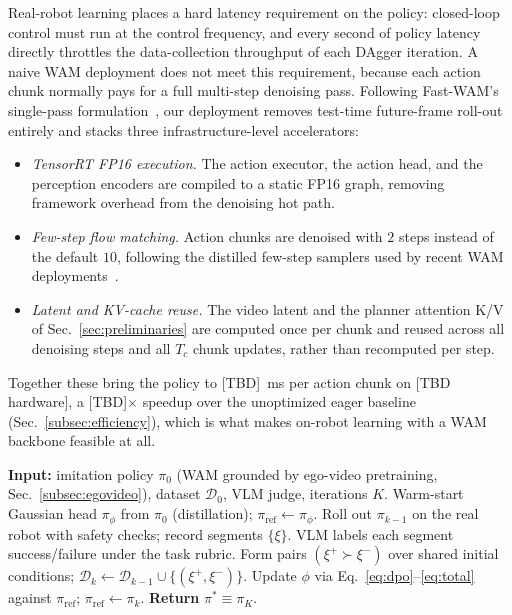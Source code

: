 \documentclass[letterpaper, 10pt, conference]{ieeeconf}
\begin{document}
Real-robot learning places a hard latency requirement on the policy: closed-loop control must run at the control frequency, and every second of policy latency directly throttles the data-collection throughput of each DAgger iteration. A naive WAM deployment does not meet this requirement, because each action chunk normally pays for a full multi-step denoising pass. Following Fast-WAM's single-pass formulation~\cite{yuan2026fastwam}, our deployment removes test-time future-frame roll-out entirely and stacks three infrastructure-level accelerators:
\begin{itemize}
\item \emph{TensorRT FP16 execution.} The action executor, the action head, and the perception encoders are compiled to a static FP16 graph, removing framework overhead from the denoising hot path.
\item \emph{Few-step flow matching.} Action chunks are denoised with $2$ steps instead of the default $10$, following the distilled few-step samplers used by recent WAM deployments~\cite{yuan2026fastwam}.
\item \emph{Latent and KV-cache reuse.} The video latent and the planner attention K/V of Sec.~\ref{sec:preliminaries} are computed once per chunk and reused across all denoising steps and all $T_c$ chunk updates, rather than recomputed per step.
\end{itemize}
Together these bring the policy to [TBD]~ms per action chunk on [TBD hardware], a [TBD]$\times$ speedup over the unoptimized eager baseline (Sec.~\ref{subsec:efficiency}), which is what makes on-robot learning with a WAM backbone feasible at all.

\begin{algorithm}[t]
\caption{Preference-Aggregated DAgger on a WAM Backbone}
\label{alg:pipeline}
\begin{algorithmic}[1]
\State \textbf{Input:} imitation policy $\pi_0$ (WAM grounded by ego-video pretraining, Sec.~\ref{subsec:egovideo}), dataset $\mathcal{D}_0$, VLM judge, iterations $K$.
\State Warm-start Gaussian head $\pi_\phi$ from $\pi_0$ (distillation); $\pi_{\text{ref}}\leftarrow\pi_\phi$.
  \State Roll out $\pi_{k-1}$ on the real robot with safety checks; record segments $\{\xi\}$.
  \State VLM labels each segment success/failure under the task rubric.
  \State Form pairs $(\xi^{+}\!\succ\!\xi^{-})$ over shared initial conditions; $\mathcal{D}_k \leftarrow \mathcal{D}_{k-1}\cup\{(\xi^{+},\xi^{-})\}$.
  \State Update $\phi$ via Eq.~\ref{eq:dpo}--\ref{eq:total} against $\pi_{\text{ref}}$; $\pi_{\text{ref}}\leftarrow\pi_k$.
\EndFor
\State \textbf{Return} $\pi^{*}\equiv\pi_K$.
\end{algorithmic}
\end{algorithm}
\end{document}
